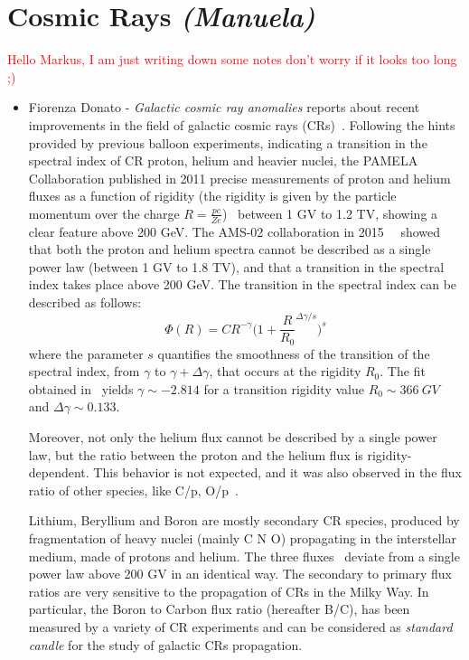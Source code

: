 \documentclass{PoS}
\begin{document}
\section{Cosmic Rays {\it (Manuela)}}
\textcolor{red}{Hello Markus, I am just writing down some notes  don't worry if it looks too long ;)}
\begin{itemize}
\item Fiorenza Donato - {\it Galactic cosmic ray anomalies}
reports about recent improvements in the field of galactic cosmic rays (CRs)~\cite{Donato}.
Following the hints provided by previous balloon experiments, indicating a transition in the spectral index of CR 
proton, helium and heavier nuclei, the 
PAMELA Collaboration published in 2011
precise measurements of proton and helium fluxes as a function of rigidity (the rigidity is given by the particle momentum over the charge $R=\frac{pc}{Ze}$)~\cite{PAMELApHe} between 1 GV to 1.2 TV, showing a clear feature above 200 GeV. 
The AMS-02 collaboration in 2015~\cite{proton}~\cite{Aguilar:2015ctt} showed  
that both the proton and helium spectra
 cannot be described as a single power law (between 1 GV to 1.8 TV), and that
a transition in the spectral index takes place above 200 GeV. 
The transition in the spectral index  can be 
described as follows: 
\begin{equation}
\Phi(R)= C R^{-\gamma} \Big( 1 + \frac{R}{R_0}^{\Delta \gamma/s} \Big)^s
\end{equation}
where the parameter $s$ quantifies  the smoothness of the transition of the
spectral index, from $\gamma$ to $\gamma+\Delta \gamma$, that occurs at the rigidity $R_0$. The fit obtained in~\cite{proton} yields $\gamma \sim -2.814$
for a transition rigidity value $R_0 \sim 366 ~GV$ and $\Delta \gamma \sim 0.133$.

Moreover, not only the helium flux cannot be described by a single power law, but the ratio
between the proton and the helium flux is rigidity-dependent. This behavior is not expected, and it was also observed in the flux ratio of other species,
like C/p, O/p~\cite{heco}. 

Lithium, Beryllium and Boron are mostly secondary CR species,
produced by fragmentation of heavy nuclei (mainly C N O) propagating in the interstellar medium, made of protons and helium. 
The three fluxes~\cite{libeb} deviate from a single power law above 200 GV in an identical way.
The  secondary to primary flux ratios are very sensitive to the propagation of CRs in the Milky Way. In particular, the Boron to Carbon flux ratio (hereafter B/C), has been measured by a variety of CR experiments and
can be considered as \textit{standard candle} for the study of galactic CRs propagation. 


\end{itemize}
\end{document}
